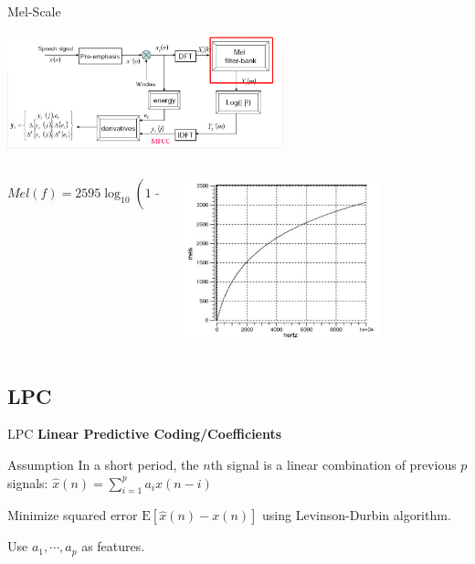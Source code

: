 \begin{frame}{Mel-Scale}
\begin{center}
  \includegraphics[width=0.6\textwidth]{res/MFCC-mel-filterbank.png}
\end{center}
\begin{columns}
  \begin{column}{0.5\textwidth}
    \[ Mel(f) = 2595 \log_{10}(1 + \dfrac{f}{700})\]
  \end{column}
  \begin{column}{0.5\textwidth}
    \begin{flushleft}
      \includegraphics[width=0.7\textwidth]{res/mel-scale.png}
    \end{flushleft}
  \end{column}
\end{columns}
\end{frame}


\subsection{LPC}
\begin{frame}{LPC}
  \textbf{Linear Predictive Coding/Coefficients}

\begin{exampleblock}{Assumption}
    In a short period, the $n$th signal is a linear combination of previous $p$ signals:
    $ \hat{x}(n) = \sum_{i=1}^pa_i x(n-i)$
\end{exampleblock}
\pause
Minimize squared error $\text{E}\left[ \hat{x}(n) - x(n)\right] $ using Levinson-Durbin algorithm.

Use $a_1, \cdots  , a_p$ as features.
\end{frame}

